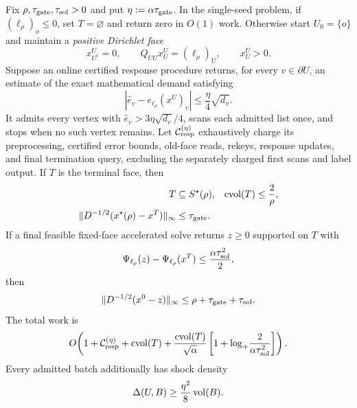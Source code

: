 \begin{theorem}
\label{thm:finite-resolution-continuation}
Fix $\rho,\tau_{\rm gate},\tau_{\rm sol}>0$ and put
$\eta:=\alpha\tau_{\rm gate}$.  In the single-seed problem, if
$(\ell_\rho)_o\leq0$, set $T=\varnothing$ and return zero in $O(1)$ work.
Otherwise start
$U_0=\{o\}$ and maintain a \emph{positive Dirichlet face}
\begin{equation*}
 x^U_{U^c}=0,
 \qquad Q_{UU}x^U_U=(\ell_\rho)_U,
 \qquad x^U_U>0.
\end{equation*}
Suppose an online certified response procedure returns, for every
$v\in\partial U$, an estimate of the exact mathematical demand satisfying
\begin{equation}
 |\widehat e_v-e_{\ell_\rho}(x^U)_v|
 \leq\frac\eta4\sqrt{d_v}.
 \label{eq:finite-response-certificate}
\end{equation}
It admits every vertex with
$\widehat e_v>3\eta\sqrt{d_v}/4$, scans each admitted list once, and stops
when no such vertex remains.  Let
$\mathcal C_{\rm resp}^{(\eta)}$ exhaustively charge its preprocessing,
certified error bounds, old-face reads, rekeys, response updates, and final
termination query, excluding the separately charged first scans and label
output.  If $T$ is the terminal face, then
\begin{align}
 T&\subseteq S^\star(\rho),
 &\operatorname{cvol}(T)&\leq\frac2\rho,
 \label{eq:finite-response-safety}\\
 \|D^{-1/2}(x^\star(\rho)-x^T)\|_\infty
 &\leq\tau_{\rm gate}.
 \label{eq:finite-response-gate-error}
\end{align}
If a final feasible fixed-face accelerated solve returns $z\geq0$ supported
on $T$ with
\begin{equation}
 \Psi_{\ell_\rho}(z)-\Psi_{\ell_\rho}(x^T)
 \leq\frac{\alpha\tau_{\rm sol}^2}{2},
 \label{eq:finite-response-solve-error}
\end{equation}
then
\begin{equation}
 \|D^{-1/2}(x^0-z)\|_\infty
 \leq\rho+\tau_{\rm gate}+\tau_{\rm sol}.
 \label{eq:finite-response-total-error}
\end{equation}
The total work is
\begin{equation}
 O\!\left(
  1+\mathcal C_{\rm resp}^{(\eta)}+\operatorname{cvol}(T)
  +\frac{\operatorname{cvol}(T)}{\sqrt\alpha}
    \left[1+\log_+\!\frac{2}{\alpha\tau_{\rm sol}^2}\right]
 \right).
 \label{eq:finite-response-work}
\end{equation}
Every admitted batch additionally has shock density
\begin{equation}
 \Delta(U,B)\geq\frac{\eta^2}{8}\operatorname{vol}(B).
 \label{eq:finite-response-shock-density}
\end{equation}
\end{theorem}


